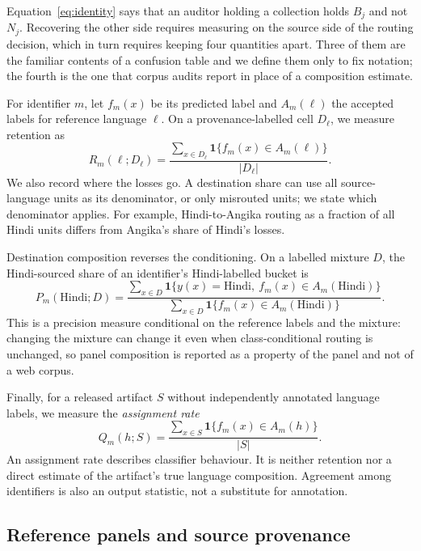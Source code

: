 \documentclass[final]{clv2025}
\begin{document}
Equation~\ref{eq:identity} says that an auditor holding a collection holds $B_j$ and not $N_j$. Recovering the other side requires measuring on the source side of the routing decision, which in turn requires keeping four quantities apart. Three of them are the familiar contents of a confusion table and we define them only to fix notation; the fourth is the one that corpus audits report in place of a composition estimate.

For identifier $m$, let $f_m(x)$ be its predicted label and $A_m(\ell)$ the accepted labels for reference language $\ell$. On a provenance-labelled cell $D_\ell$, we measure retention as
\begin{equation}
R_m(\ell;D_\ell)=\frac{\sum_{x\in D_\ell}\mathbf{1}\{f_m(x)\in A_m(\ell)\}}{|D_\ell|}.
\end{equation}
We also record where the losses go. A destination share can use all source-language units as its denominator, or only misrouted units; we state which denominator applies. For example, Hindi-to-Angika routing as a fraction of all Hindi units differs from Angika's share of Hindi's losses.

Destination composition reverses the conditioning. On a labelled mixture $D$, the Hindi-sourced share of an identifier's Hindi-labelled bucket is
\begin{equation}
P_m(\mathrm{Hindi};D)=
\frac{\sum_{x\in D}\mathbf{1}\{y(x)=\mathrm{Hindi},\ f_m(x)\in A_m(\mathrm{Hindi})\}}
{\sum_{x\in D}\mathbf{1}\{f_m(x)\in A_m(\mathrm{Hindi})\}}.
\end{equation}
This is a precision measure conditional on the reference labels and the mixture: changing the mixture can change it even when class-conditional routing is unchanged, so panel composition is reported as a property of the panel and not of a web corpus.

Finally, for a released artifact $S$ without independently annotated language labels, we measure the \emph{assignment rate}
\begin{equation}
Q_m(h;S)=\frac{\sum_{x\in S}\mathbf{1}\{f_m(x)\in A_m(h)\}}{|S|}.
\end{equation}
An assignment rate describes classifier behaviour. It is neither retention nor a direct estimate of the artifact's true language composition. Agreement among identifiers is also an output statistic, not a substitute for annotation.

\subsection{Reference panels and source provenance}
\end{document}
